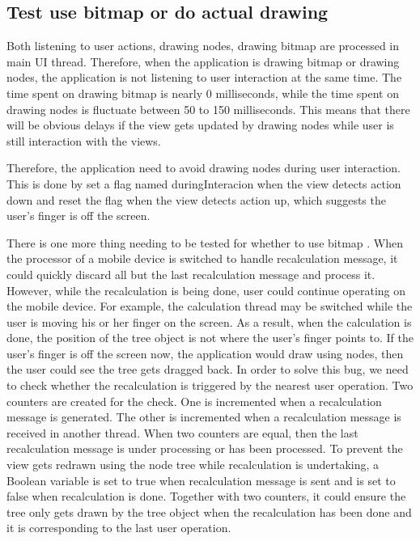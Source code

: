 \documentclass[MSc]{icldt}
\begin{document}
\subsection{Test use bitmap or do actual drawing}

Both listening to user actions, drawing nodes, drawing bitmap are processed in main UI thread. Therefore, when the application is drawing bitmap or drawing nodes, the application is not listening to user interaction at the same time. The time spent on drawing bitmap is nearly 0 milliseconds, while the time spent on drawing nodes is fluctuate between 50 to 150 milliseconds. This means that there will be obvious delays if the view gets updated by drawing nodes while user is still interaction with the views.

Therefore, the application need to avoid drawing nodes during user interaction. This is done by set a flag named duringInteracion when  the view detects action down and reset the flag when the view detects action up, which suggests the user's finger is off the screen. 

There is one more thing needing to be tested for whether to use bitmap . When the processor of a mobile device is switched to handle recalculation message, it could quickly discard all but the last recalculation message and process it. However, while the recalculation is being done, user could continue operating on the mobile device. For example, the calculation thread may be switched while the user is moving his or her finger on the screen. As a result, when the calculation is done, the position of the tree object is not where the user's finger points to. If the user's finger is off the screen now, the application would draw using nodes, then the user could see the tree gets dragged back. In order to solve this bug, we need to check whether the recalculation is triggered by the nearest user operation. Two counters are created for the check. One is incremented when a recalculation message is generated. The other is incremented when a recalculation message is received in another thread. When two counters are equal, then the last recalculation message is under processing or has been processed. To prevent the view gets redrawn using the node tree while recalculation is undertaking, a Boolean variable is set to true when recalculation message is sent and is set to false when recalculation is done. Together with two counters, it could ensure the tree only gets drawn by the tree object when the recalculation has been done and it is corresponding to the last user operation. 
\end{document}
